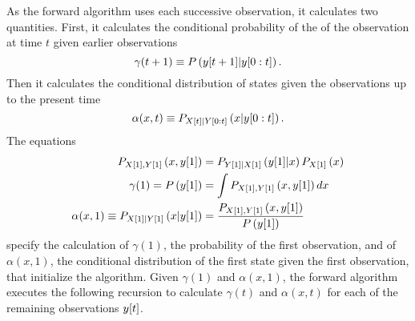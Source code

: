 As the forward algorithm uses each successive observation, it
calculates two quantities.  First, it calculates the conditional
probability of the of the observation at time $t$ given earlier
observations
\begin{equation*}
  \gamma(t+1) \equiv P\left({y}{[t+1]}|y[0:t] \right).
\end{equation*}
Then it calculates the conditional distribution of states given the
observations up to the present time
\begin{equation*}
  \alpha(x,t) \equiv P_{{X}{[t]}|Y[0:t]} \left(x|y[0:t]
  \right).
\end{equation*}
The equations
\begin{align}
  \label{eq:ContInitial}
  P_{{X}{[1]},{Y}{[1]}} \left(x,{y}{[1]} \right) &=
  P_{{Y}{[1]}|{X}{[1]}} \left({y}{[1]}|x \right)P_{{X}{[1]}}
  \left(x \right) \\
  \gamma(1) = P\left({y}{[1]} \right) & = \int
  P_{{X}{[1]},{Y}{[1]}}
  \left(x,{y}{[1]} \right) dx \\
  \alpha(x,1) \equiv P_{{X}{[1]}|{Y}{[1]}} \left(x|{y}{[1]} \right) &=
  \frac{P_{{X}{[1]},{Y}{[1]}} \left(x,{y}{[1]}
    \right)}{P\left({y}{[1]} \right)}
\end{align}
specify the calculation of $\gamma(1)$, the probability of the first
observation, and of $\alpha(x,1)$, the conditional distribution of the
first state given the first observation, that initialize the
algorithm.  Given $\gamma(1)$ and $\alpha(x,1)$, the forward algorithm
executes the following recursion to calculate $\gamma(t)$ and
$\alpha(x,t)$ for each of the remaining observations ${y}{[t]}$.
